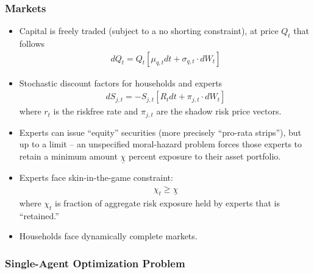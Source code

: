 \documentclass[12pt]{article}
\newcommand{\equityConstraintSymbol}{$\underline{\chi}$\xspace}
\begin{document}
\subsubsection{Markets}
\begin{itemize}
\item Capital is freely traded (subject to a no shorting constraint), at price $Q_t$ that follows
\begin{align*}
dQ_t = Q_t [\mu_{q,t} dt + \sigma_{q,t} \cdot dW_t]  
\end{align*}
\item Stochastic discount factors for households and experts
\begin{align*}
dS_{j,t} = - S_{j,t} [R_t dt + \pi_{j,t} \cdot dW_t] \end{align*}
where $r_t$ is the riskfree rate and $\pi_{j,t}$ are the shadow risk price vectors.  
\item Experts can issue “equity” securities (more precisely “pro-rata strips”), but up to a limit – an unspecified moral-hazard problem forces those experts to retain a minimum amount \equityConstraintSymbol percent exposure to their asset portfolio. 
\item Experts face skin-in-the-game constraint:
\begin{align*}
 \chi_t \geq \underline{\chi}
\end{align*}
where $\chi_t$ is fraction of aggregate risk exposure held by experts that is ``retained.''
\item Households face dynamically complete markets.
\end{itemize}

\subsubsection{Single-Agent Optimization Problem}
\end{document}
